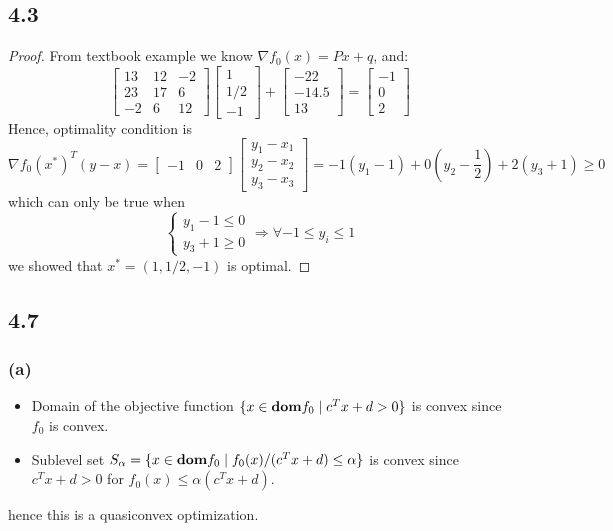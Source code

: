 \documentclass{article}
\newcommand{\dom}{{\mbox{\bf dom}}}
\begin{document}
 \subsection*{4.3}   
 \begin{proof}
 From textbook example we know $\nabla f_0(x) = Px + q $, and: 
 \[\begin{bmatrix}
13 & 12 & -2 \\
23& 17 & 6 \\
-2 & 6 & 12
\end{bmatrix} 
\begin{bmatrix}
1\\
1/2 \\
-1
\end{bmatrix} + 
\begin{bmatrix}
-22\\ 
-14.5 \\
13
\end{bmatrix} =
\begin{bmatrix}
-1\\
0 \\
2
\end{bmatrix}\]
Hence, optimality condition is 
\[\nabla f_0(x^*)^T (y -x)  = \begin{bmatrix}
-1 & 0 & 2
\end{bmatrix}\begin{bmatrix}
y_1 - x_1\\
y_2 - x_2\\
y_3 - x_3
\end{bmatrix}= -1 (y_1 -1) + 0 (y_2-\frac{1}{2}) + 2 (y_3 +1) \ge 0 \]
which can only be true when 
\[
 \begin{cases}
            y_1 - 1 \le 0 \\
           y_3 +1 \ge 0
        \end{cases} \Rightarrow \forall -1 \le y_i \le 1 
\]
we showed that $x^* = (1,1/2,-1)$ is optimal.
\end{proof}
  \subsection*{4.7 }  
  \subsubsection*{(a)}
  \begin{itemize}
  \item Domain of the objective function $\{x \in \dom f_0 \mid c^Tx + d >0 \}$ is convex since $f_0$ is convex.
  \item Sublevel set $S_{\alpha} = \{ x \in \dom f_0 \mid f_0(x)/(c^Tx + d) \le \alpha\}$ is convex since  $c^Tx + d >0 $ for $f_0(x) \le \alpha (c^Tx + d)$.
  \end{itemize}
  hence this is a quasiconvex optimization.
\end{document}
